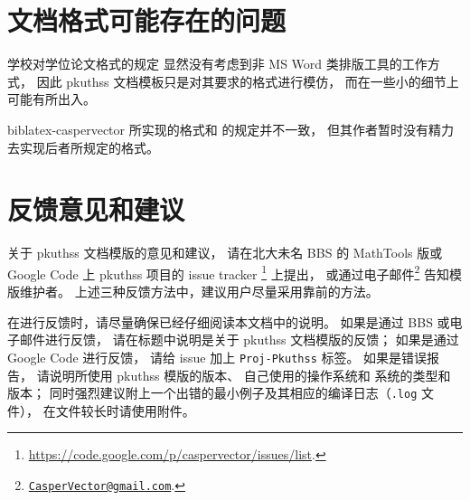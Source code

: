 	\section{文档格式可能存在的问题}

	学校对学位论文格式的规定\mbox{\supercite{pku-thesisstyle}}%
	显然没有考虑到非 MS Word 类排版工具的工作方式，
	因此 pkuthss 文档模板只是对其要求的格式进行模仿，
	而在一些小的细节上可能有所出入。

	biblatex-caspervector\supercite{biblatex-caspervector} 所实现的格式和 %
	\parencite{pku-thesisstyle} 的规定并不一致，
	但其作者暂时没有精力去实现后者所规定的格式。

	\section{反馈意见和建议}

	关于 pkuthss 文档模版的意见和建议，
	请在北大未名 BBS 的 MathTools 版或 %
	Google Code 上 pkuthss 项目的 issue tracker%
	\footnote{\url{https://code.google.com/p/caspervector/issues/list}.}%
	上提出，
	或通过电子邮件\footnote%
	{\href{mailto:CasperVector@gmail.com}{\texttt{CasperVector@gmail.com}}.}%
	告知模版维护者。
	上述三种反馈方法中，建议用户尽量采用靠前的方法。

	在进行反馈时，请尽量确保已经仔细阅读本文档中的说明。
	如果是通过 BBS 或电子邮件进行反馈，
	请在标题中说明是关于 pkuthss 文档模版的反馈；
	如果是通过 Google Code 进行反馈，
	请给 issue 加上 \verb|Proj-Pkuthss| 标签。
	如果是错误报告，
	请说明所使用 pkuthss 模版的版本、
	自己使用的操作系统和  系统的类型和版本；
	同时强烈建议附上一个出错的最小例子及其相应的编译日志（\verb|.log| 文件），
	在文件较长时请使用附件。

